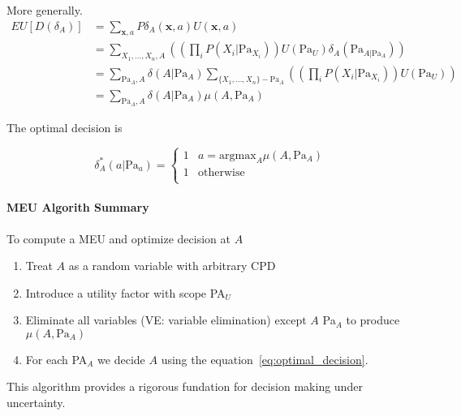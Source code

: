 \vspace{0.3cm}

More generally. 
\begin{equation}
\begin{split}
 EU[D(\delta_A)] & = \sum_{\bm{x},a} P\delta_A(\bm{x},a) U(\bm{x},a) \\
 & = \sum_{X_1, \dots, X_n, A} \left( \left(\prod_i P(X_i|\text{Pa}_{X_i}) \right) U(\text{Pa}_{U}) \delta_A(\text{Pa}_{A|\text{Pa}_A})\right) \\
 & = \sum_{\text{Pa}_A, A} \delta(A|\text{Pa}_A) \sum_{\{X_1, \dots , X_n\} - \text{Pa}_A}  \left( \left(\prod_i P(X_i|\text{Pa}_{X_i}) \right) U(\text{Pa}_{U})\right) \\
 & = \sum_{\text{Pa}_A, A} \delta(A|\text{Pa}_A) \mu(A,\text{Pa}_A)
 \end{split}
\end{equation}

The optimal decision is

\begin{equation}\label{eq:optimal_decision}
 \delta^*_A(a|\text{Pa}_a) = 
 \begin{cases}
  1  & a = \text{argmax}_A \mu(A,\text{Pa}_A) \\
  1  & \text{otherwise} \\
 \end{cases}
\end{equation}

\paragraph{MEU Algorith Summary}

To compute a MEU and optimize decision at $A$

\begin{enumerate}
 \item Treat $A$ as a random variable with arbitrary CPD
 \item Introduce a utility factor with scope PA$_U$
 \item Eliminate all variables (VE: variable elimination) except $A$ Pa$_A$ to produce $\mu(A,\text{Pa}_A)$
 \item For each PA$_A$ we decide $A$ using the equation~\ref{eq:optimal_decision}.
\end{enumerate}


This algorithm provides a rigorous fundation for decision making under uncertainty.
